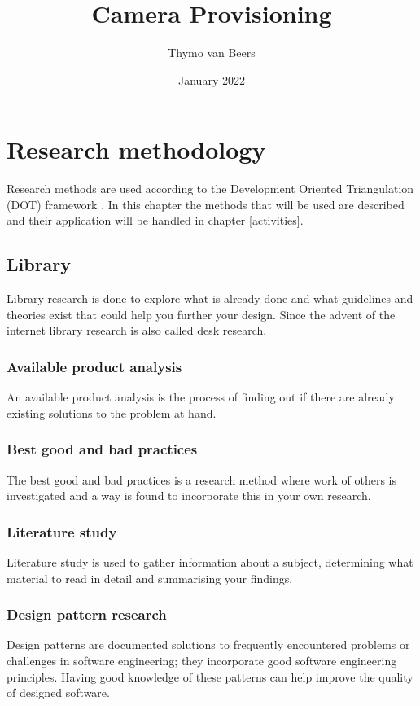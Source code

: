 \documentclass[11pt, a4paper]{article}
\title{Camera Provisioning}
\author{Thymo van Beers}
\date{January 2022}
\begin{document}






\section{Research methodology} \label{methods}
Research methods are used according to the Development Oriented Triangulation (DOT) framework \cite{dot_framework}. In this chapter the methods that
will be used are described and their application will be handled in chapter \ref{activities}.
\subsection{Library}
Library research is done to explore what is already done and what guidelines and theories exist that could help you further your design. Since the advent of the internet library research is also called desk research.

\subsubsection{Available product analysis}
An available product analysis is the process of finding out if there are already existing solutions to the problem at hand.

\subsubsection{Best good and bad practices}
The best good and bad practices is a research method where work of others is investigated and a way is found to incorporate this in your own research.

\subsubsection{Literature study}
Literature study is used to gather information about a subject, determining what material to read in detail and summarising your findings.

\subsubsection{Design pattern research}
Design patterns are documented solutions to frequently encountered problems or challenges in software engineering; they incorporate good software engineering principles. Having good knowledge of these patterns can help improve the quality of designed software.
\end{document}
